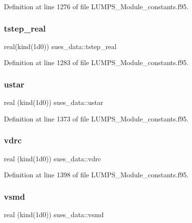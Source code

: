 Definition at line 1276 of file L\+U\+M\+P\+S\+\_\+\+Module\+\_\+constants.\+f95.

\mbox{\label{namespacesues__data_a81a241a978fdd040dee716c4e68dc786}} 
\subsubsection{\texorpdfstring{tstep\+\_\+real}{tstep\_real}}
{\footnotesize\ttfamily real(kind(1d0)) sues\+\_\+data\+::tstep\+\_\+real}



Definition at line 1283 of file L\+U\+M\+P\+S\+\_\+\+Module\+\_\+constants.\+f95.

\mbox{\label{namespacesues__data_a3422c30d52ea500ca138d13670403a50}} 
\subsubsection{\texorpdfstring{ustar}{ustar}}
{\footnotesize\ttfamily real (kind(1d0)) sues\+\_\+data\+::ustar}



Definition at line 1373 of file L\+U\+M\+P\+S\+\_\+\+Module\+\_\+constants.\+f95.

\mbox{\label{namespacesues__data_a79ee74466d17ed05bb20f195934f383b}} 
\subsubsection{\texorpdfstring{vdrc}{vdrc}}
{\footnotesize\ttfamily real (kind(1d0)) sues\+\_\+data\+::vdrc}



Definition at line 1398 of file L\+U\+M\+P\+S\+\_\+\+Module\+\_\+constants.\+f95.

\mbox{\label{namespacesues__data_adfce8b9e1538d8a1629df9963a7a6df0}} 
\subsubsection{\texorpdfstring{vsmd}{vsmd}}
{\footnotesize\ttfamily real (kind(1d0)) sues\+\_\+data\+::vsmd}



